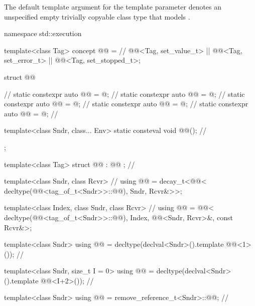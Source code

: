\pnum
\remarks
The default template argument for the  template parameter
denotes an unspecified empty trivially copyable class type
that models .

\begin{codeblock}
namespace std::execution {
  template<class Tag>
  concept @@ =                                      // \expos
    @@<Tag, set_value_t> || @@<Tag, set_error_t> || @@<Tag, set_stopped_t>;

  struct @@ {                                        // \expos
    static constexpr auto @@ = @\seebelownc@;                // \expos
    static constexpr auto @@ = @\seebelownc@;                  // \expos
    static constexpr auto @@ = @\seebelownc@;                // \expos
    static constexpr auto @@ = @\seebelownc@;                    // \expos
    static constexpr auto @@ = @\seebelownc@;                 // \expos

    template<class Sndr, class... Env>
      static consteval void @@();                      // \expos
  };

  template<class Tag>
  struct @@ : @@ {};                          // \expos

  template<class Sndr, class Rcvr>                              // \expos
  using @@ = decay_t<@@<
    decltype(@@<tag_of_t<Sndr>>::@@), Sndr, Rcvr&>>;

  template<class Index, class Sndr, class Rcvr>                 // \expos
  using @@ = @@<
    decltype(@@<tag_of_t<Sndr>>::@@), Index,
    @@<Sndr, Rcvr>&, const Rcvr&>;

  template<class Sndr>
  using @@ = decltype(declval<Sndr>().template @@<1>());                // \expos

  template<class Sndr, size_t I = 0>
  using @@ = decltype(declval<Sndr>().template @@<I+2>());             // \expos

  template<class Sndr>
  using @@ = remove_reference_t<Sndr>::@@;                    // \expos

}
\end{codeblock}
